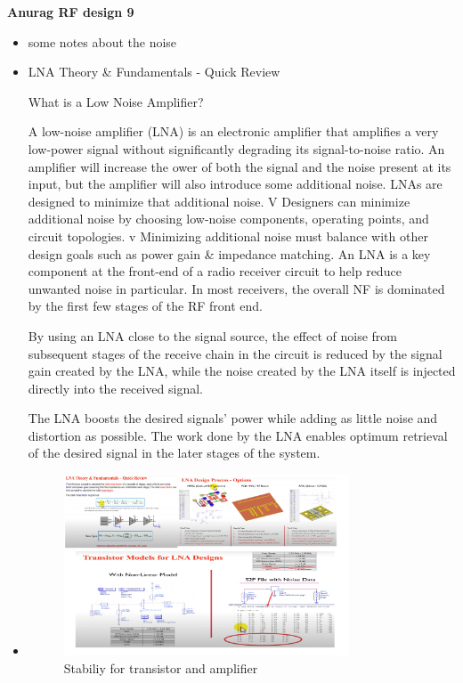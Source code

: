 \documentclass{article}
\begin{document}
\textbf{Anurag RF design 9}
\begin{itemize}
    \item some notes about the noise
    \item LNA Theory & Fundamentals - Quick Review

    What is a Low Noise Amplifier?
    
    A low-noise amplifier (LNA) is an electronic amplifier that amplifies a very low-power signal without
    significantly degrading its signal-to-noise ratio.
    An amplifier will increase the ower of both the signal and the noise present at its input, but the amplifier will
    also introduce some additional noise. LNAs are designed to minimize that additional noise.
    V Designers can minimize additional noise by choosing low-noise components, operating points, and
    circuit topologies.
    v Minimizing additional noise must balance with other design goals such as power gain & impedance matching.
    An LNA is a key component at the front-end of a radio
receiver circuit to help reduce unwanted noise in particular. In
most receivers, the overall NF is dominated by the first few
stages of the RF front end.

By using an LNA close to the signal source, the effect of noise from subsequent stages of the receive chain in
the circuit is reduced by the signal gain created by the LNA, while the noise created by the LNA itself is injected
directly into the received signal.


The LNA boosts the desired signals' power while adding as little noise and distortion as possible. The work done
by the LNA enables optimum retrieval of the desired signal in the later stages of the system.
    




    
    \item \begin{figure}[H]
        \centering
        \includegraphics[width=0.8\textwidth]{figures/Noise1.pdf}
        \caption{Stabiliy for transistor and amplifier}
        \label{Noise1}
    \end{figure}
    

\end{itemize}
\end{document}
